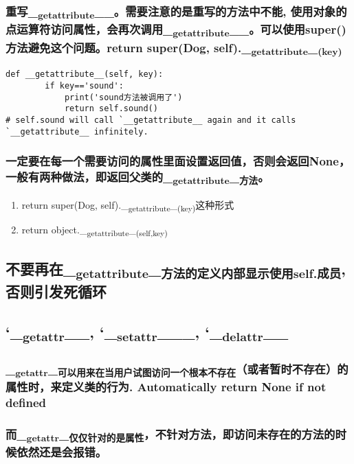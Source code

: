\documentclass[11pt]{article}
\begin{document}
\subsubsection{重写\_\textsubscript{getattribute}\_\_。需要注意的是重写的方法中不能, 使用对象的点运算符访问属性，会再次调用\_\textsubscript{getattribute}\_\_。可以使用super()方法避免这个问题。return super(Dog, self).\_\textsubscript{getattribute}\_\textsubscript{(key)}}
\label{sec:org6013e8f}
\begin{verbatim}
def __getattribute__(self, key):
        if key=='sound':
            print('sound方法被调用了')
            return self.sound()
# self.sound will call `__getattribute__ again and it calls `__getattribute__ infinitely.
\end{verbatim}
\subsubsection{一定要在每一个需要访问的属性里面设置返回值，否则会返回None，一般有两种做法，即返回父类的\_\textsubscript{getattribute}\_\textsubscript{方法}。}
\label{sec:org0c9ba80}
\begin{enumerate}
\item return super(Dog, self).\_\textsubscript{getattribute}\_\textsubscript{(key)}这种形式
\label{sec:org93b2708}
\item return object.\_\textsubscript{getattribute}\_\textsubscript{(self,key)}
\label{sec:org4357add}
\end{enumerate}
\subsection{不要再在\_\textsubscript{getattribute}\_\textsubscript{方法的定义内部显示使用self.成员}, 否则引发死循环}
\label{sec:org75cfea4}
\subsection{`\_\textsubscript{getattr}\_\_, `\_\textsubscript{setattr}\_\_\_, `\_\textsubscript{delattr}\_\_}
\label{sec:org667c1c2}
\subsubsection{\_\textsubscript{getattr}\_\textsubscript{可以用来在当用户试图访问一个根本不存在}（或者暂时不存在）的属性时，来定义类的行为. Automatically return None if not defined}
\label{sec:org3fd657c}
\subsubsection{而\_\textsubscript{getattr}\_\textsubscript{仅仅针对的是属性}，不针对方法，即访问未存在的方法的时候依然还是会报错。}
\label{sec:org249b734}
\end{document}
